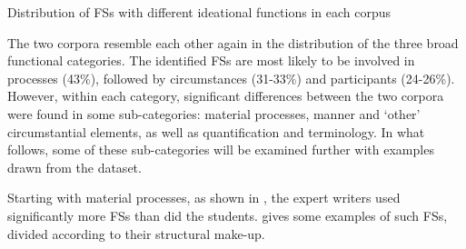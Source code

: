 \documentclass[output=paper]{langsci/langscibook}
\begin{document}
\begin{table}
\caption{Distribution of FSs with different ideational functions in each corpus}
\label{tab:key:4}
\end{table}

The two corpora resemble each other again in the distribution of the three broad functional categories. The identified FSs are most likely to be involved in processes (43\%), followed by circumstances (31-33\%) and participants (24-26\%). However, within each category, significant differences between the two corpora were found in some sub-categories: material processes, manner and ‘other’ circumstantial elements, as well as quantification and terminology. In what follows, some of these sub-categories will be examined further with examples drawn from the dataset. 

Starting with material processes, as shown in , the expert writers used significantly more FSs than did the students.  gives some examples of such FSs, divided according to their structural make-up. 
\end{document}
